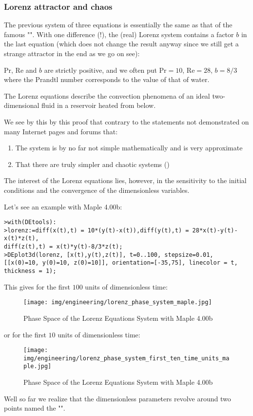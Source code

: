	\subsubsection{Lorenz attractor and chaos}
	The previous system of three equations is essentially the same as that of the famous "". With one difference (!), the (real) Lorenz system contains a factor $b$ in the last equation (which does not change the result anyway since we still get a strange attractor in the end as we go on see):
	
	Pr, Re and $b$ are strictly positive, and we often put $\text{Pr}=10$, $\text{Re}=28$, $b=8/3$ where the Prandtl number corresponds to the value of that of water.

	The Lorenz equations describe the convection phenomena of an ideal two-dimensional fluid in a reservoir heated from below.

	We see by this by this proof that contrary to the statements not demonstrated on many Internet pages and forums that:
	\begin{enumerate}
		\item The system is by no far not simple mathematically and is very approximate

		\item That there are truly simpler and chaotic systems ()
	\end{enumerate}
	The interest of the Lorenz equations lies, however, in the sensitivity to the initial conditions and the convergence of the dimensionless variables.

	Let's see an example with Maple 4.00b:

	\texttt{>with(DEtools):\\
		>lorenz:=diff(x(t),t) = 10*(y(t)-x(t)),diff(y(t),t) = 28*x(t)-y(t)-x(t)*z(t),\\
		diff(z(t),t) = x(t)*y(t)-8/3*z(t);\\
		>DEplot3d({lorenz}, [x(t),y(t),z(t)], t=0..100, stepsize=0.01, 
		[[x(0)=10, y(0)=10, z(0)=10]], orientation=[-35,75], linecolor = t, thickness = 1);\\
	}
	
	This gives for the first $100$ units of dimensionless time:
	\begin{figure}[H]
		\centering
		\texttt{[image: img/engineering/lorenz\_phase\_system\_maple.jpg]}	
		\caption{Phase Space of the Lorenz Equations System with Maple 4.00b}
	\end{figure}
	or for the first $10$ units of dimensionless time:
	\begin{figure}[H]
		\centering
		\texttt{[image: img/engineering/lorenz\_phase\_system\_first\_ten\_time\_units\_maple.jpg]}	
		\caption[]{Phase Space of the Lorenz Equations System with Maple 4.00b}
	\end{figure}
	Well so far we realize that the dimensionless parameters revolve around two points named the "".

